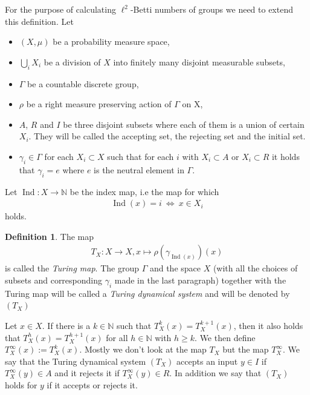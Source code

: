 \documentclass[12pt,a4paper]{scrartcl}
\theoremstyle{plain}
\theoremstyle{definition}
\newtheorem{Definition}[Theorem]{Definition}
\numberwithin{equation}{section}
\newcommand{\N}{\mathbb{N}} %
\newcommand{\2}{\mathbb{Z} / 2 \mathbb{Z}}
\newcommand{\1}{\bar{1}}
\newcommand{\0}{\bar{0}}
\newcommand{\Ind}{\operatorname{Ind}}
\begin{document}
For the purpose of calculating $\ell^2$-Betti numbers of groups we need to extend this definition. 
Let
\begin{itemize}
	\item $(X, \mu)$ be a probability measure space,
	\item $\bigcup_{i} X_i$ be a division of $X$ into finitely many disjoint measurable subsets,
	\item $\Gamma$ be a countable discrete group,
	\item $\rho$ be a right measure preserving action of $\Gamma$ on X,
	\item $A$, $R$ and $I$ be three disjoint subsets where each of them is a union of certain $X_i$. They will be called the accepting set, the rejecting set and the initial set.
	\item $\gamma_i \in \Gamma$ for each $X_i \subset X$ such that for each $i$ with $X_i \subset A$ or $X_i \subset R$ it holds that $\gamma_i = e$ where $e$ is the neutral element in $\Gamma$.
\end{itemize}
Let $\Ind\colon X \to \N$ be the index map, i.e the map for which
\begin{align*}
	\Ind(x) = i ~\Leftrightarrow~ x \in X_i
\end{align*}
holds.
\begin{Definition}
	 The map 
	 \begin{align*}
	 T_X\colon X \to X, x \mapsto \rho(\gamma_{\Ind(x)})(x)
	 \end{align*}
	 is called the \emph{Turing map}.
	 The group $\Gamma$ and the space $X$ (with all the choices of subsets and corresponding $\gamma_i$ made in the last paragraph) together with the Turing map will be called a \emph{Turing dynamical system} and will be denoted by $(T_X)$
\end{Definition}
Let $x \in X$. If there is a $k \in \N$ such that $T_X^k(x) = T_X^{k + 1}(x)$, then it also holds that $T_X^h(x) = T_X^{h + 1}(x)$ for all $h \in \N$ with $h \geq k$. We then define $T_X^\infty (x) := T_X^k(x)$. Mostly we don't look at the map $T_X$ but the map $T_X^\infty$. We say that the Turing dynamical system $(T_X)$ accepts an input $y \in I$ if $T_X^\infty(y) \in A$ and it rejects it if $T_X^\infty(y) \in R$. In addition we say that $(T_X)$ holds for $y$ if it accepts or rejects it.
\end{document}
